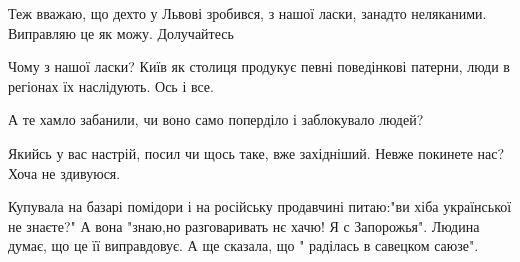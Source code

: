 \begin{itemize}
 

Теж вважаю, що дехто у Львові зробився, з нашої ласки, занадто неляканими.
Виправляю це як можу. Долучайтесь


\begin{itemize}
 
Чому з нашої ласки? Київ як столиця продукує певні поведінкові патерни, люди в регіонах їх наслідують. Ось і все.
\end{itemize}

 
А те хамло забанили, чи воно само поперділо і заблокувало людей?

 
Якийсь у вас настрій, посил чи щось таке, вже західніший. Невже покинете нас? Хоча не здивуюся.

 

Купувала на базарі помідори і на російську продавчині питаю:"ви хіба
української не знаєте?" А вона "знаю,но разговаривать нє хачю! Я с Запорожья".
Людина думає, що це її виправдовує. А ще сказала, що " раділась в савецком
саюзе".

\begin{itemize}
 

\end{itemize}
\end{itemize}
